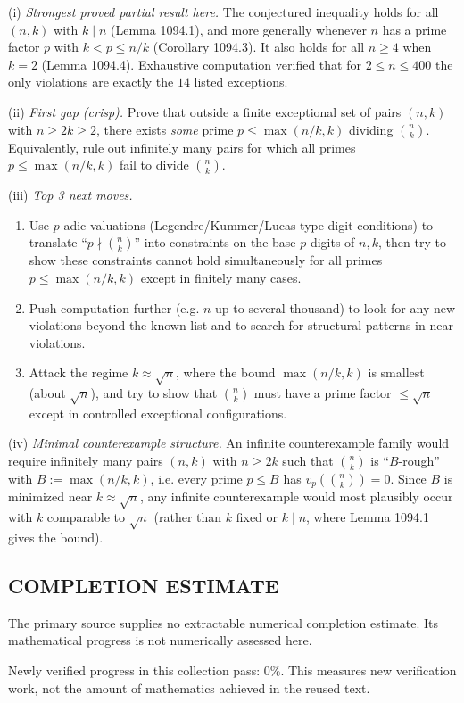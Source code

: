 \smallskip
\noindent
(i) \emph{Strongest proved partial result here.}
The conjectured inequality holds for all $(n,k)$ with $k\mid n$ (Lemma 1094.1), and more generally whenever $n$ has a prime factor $p$ with $k<p\le n/k$ (Corollary 1094.3). It also holds for all $n\ge 4$ when $k=2$ (Lemma 1094.4). Exhaustive computation verified that for $2\le n\le 400$ the only violations are exactly the $14$ listed exceptions.

\smallskip
\noindent
(ii) \emph{First gap (crisp).}
Prove that outside a finite exceptional set of pairs $(n,k)$ with $n\ge 2k\ge 2$, there exists \emph{some} prime $p\le \max(n/k,k)$ dividing $\binom{n}{k}$. Equivalently, rule out infinitely many pairs for which all primes $p\le \max(n/k,k)$ fail to divide $\binom{n}{k}$.

\smallskip
\noindent
(iii) \emph{Top 3 next moves.}
\begin{enumerate}
\item Use $p$-adic valuations (Legendre/Kummer/Lucas-type digit conditions) to translate ``$p\nmid\binom{n}{k}$'' into constraints on the base-$p$ digits of $n,k$, then try to show these constraints cannot hold simultaneously for all primes $p\le \max(n/k,k)$ except in finitely many cases.
\item Push computation further (e.g. $n$ up to several thousand) to look for any new violations beyond the known list and to search for structural patterns in near-violations.
\item Attack the regime $k\approx \sqrt{n}$, where the bound $\max(n/k,k)$ is smallest (about $\sqrt{n}$), and try to show that $\binom{n}{k}$ must have a prime factor $\le \sqrt{n}$ except in controlled exceptional configurations.
\end{enumerate}

\smallskip
\noindent
(iv) \emph{Minimal counterexample structure.}
An infinite counterexample family would require infinitely many pairs $(n,k)$ with $n\ge 2k$ such that $\binom{n}{k}$ is ``$B$-rough'' with $B:=\max(n/k,k)$, i.e. every prime $p\le B$ has $v_p\!\left(\binom{n}{k}\right)=0$. Since $B$ is minimized near $k\approx \sqrt{n}$, any infinite counterexample would most plausibly occur with $k$ comparable to $\sqrt{n}$ (rather than $k$ fixed or $k\mid n$, where Lemma 1094.1 gives the bound).



\subsection*{COMPLETION ESTIMATE}
The primary source supplies no extractable numerical completion estimate. Its mathematical progress is not numerically assessed here.

Newly verified progress in this collection pass: $0\%$. This measures new verification work, not the amount of mathematics achieved in the reused text.
